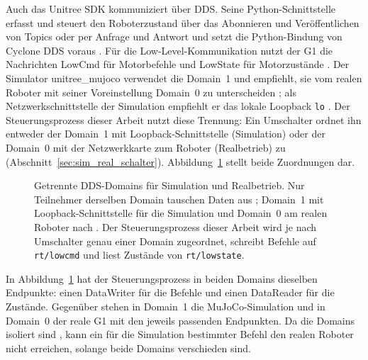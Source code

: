 Auch das Unitree SDK kommuniziert über DDS.
Seine Python-Schnittstelle erfasst und steuert den Roboterzustand über das Abonnieren und Veröffentlichen von Topics oder per Anfrage und Antwort \cite{UnitreeSDK2Py} und setzt die Python-Bindung von Cyclone DDS voraus \cite{UnitreeSDK2Py}.
Für die Low-Level-Kommunikation nutzt der G1 die Nachrichten LowCmd für Motorbefehle und LowState für Motorzustände \cite{UnitreeMujoco}.
Der Simulator unitree\_mujoco verwendet die Domain~1 und empfiehlt, sie vom realen Roboter mit seiner Voreinstellung Domain~0 zu unterscheiden \cite{UnitreeMujoco}; als Netzwerkschnittstelle der Simulation empfiehlt er das lokale Loopback \texttt{lo} \cite{UnitreeMujoco}.
Der Steuerungsprozess dieser Arbeit nutzt diese Trennung: Ein Umschalter ordnet ihn entweder der Domain~1 mit Loopback-Schnittstelle (Simulation) oder der Domain~0 mit der Netzwerkkarte zum Roboter (Realbetrieb) zu (Abschnitt~\ref{sec:sim_real_schalter}).
Abbildung~\ref{fig:dds_domains} stellt beide Zuordnungen dar.

\begin{figure}[htbp]
  \centering
  
  \caption[Getrennte DDS-Domains für Simulation und Realbetrieb]{Getrennte DDS-Domains für Simulation und Realbetrieb. Nur Teilnehmer derselben Domain tauschen Daten aus \cite{OMG2015}; Domain~1 mit Loopback-Schnittstelle für die Simulation und Domain~0 am realen Roboter nach \cite{UnitreeMujoco}. Der Steuerungsprozess dieser Arbeit wird je nach Umschalter genau einer Domain zugeordnet, schreibt Befehle auf \texttt{rt/lowcmd} und liest Zustände von \texttt{rt/lowstate}.}
  \label{fig:dds_domains}
\end{figure}

In Abbildung~\ref{fig:dds_domains} hat der Steuerungsprozess in beiden Domains dieselben Endpunkte: einen DataWriter für die Befehle und einen DataReader für die Zustände.
Gegenüber stehen in Domain~1 die MuJoCo-Simulation und in Domain~0 der reale G1 mit den jeweils passenden Endpunkten.
Da die Domains isoliert sind \cite{OMG2015}, kann ein für die Simulation bestimmter Befehl den realen Roboter nicht erreichen, solange beide Domains verschieden sind.

